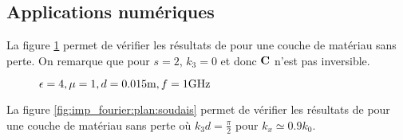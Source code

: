     \subsection{Applications numériques}

        La figure \ref{fig:imp_fourier:plan:hoppe} permet de vérifier les résultats de \cite[p.~33]{hoppe_impedance_1995} pour une couche de matériau sans perte. On remarque que pour $s=2$, $k_3 = 0$ et donc $\mathbf{C}$ n'est pas inversible.

        \begin{figure}[!hbt]
            \centering
            \caption[Reproduction résultat Hoppe & Rahmat-Samii p.~33]{$\epsilon = 4, \mu = 1, d=0.015\text{m}, f=1\text{GHz}$}
            \label{fig:imp_fourier:plan:hoppe}
        \end{figure}

        La figure \ref{fig:imp_fourier:plan:soudais} permet de vérifier les résultats de \cite{soudais_3d_2017} pour une couche de matériau sans perte où $k_3d = \frac{\pi}{2}$ pour $k_x \simeq 0.9 k_0$.

